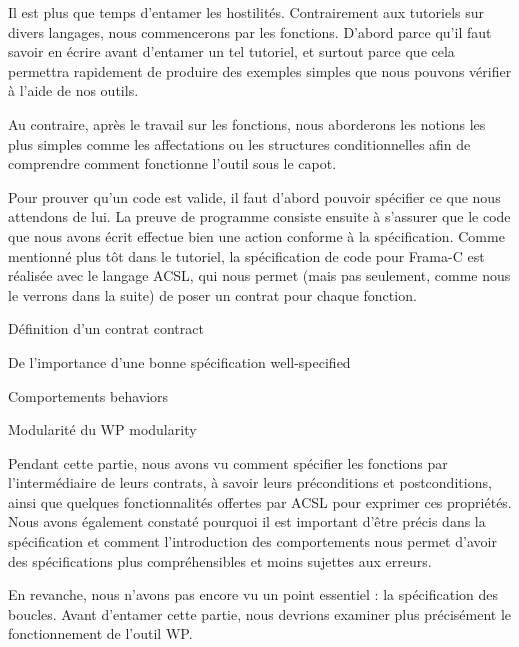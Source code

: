 
Il est plus que temps d'entamer les hostilités. Contrairement aux tutoriels
sur divers langages, nous commencerons par les fonctions. D'abord parce
qu'il faut savoir en écrire avant d'entamer un tel tutoriel, et surtout
parce que cela permettra rapidement de produire des exemples simples que
nous pouvons vérifier à l'aide de nos outils.



Au contraire, après le travail sur les fonctions, nous aborderons les notions
les plus simples comme les affectations ou les structures conditionnelles afin
de comprendre comment fonctionne l'outil sous le capot.



Pour prouver qu'un code est valide, il faut d'abord pouvoir spécifier
ce que nous attendons de lui. La preuve de programme consiste ensuite à
s'assurer que le code que nous avons écrit effectue bien une action conforme à
la spécification. Comme mentionné plus tôt dans le tutoriel, la
spécification de code pour Frama-C est réalisée avec le langage ACSL, qui
nous permet (mais pas seulement, comme nous le verrons dans la suite) de poser
un contrat pour chaque fonction.



\begin{levelTwo}
  {Définition d'un contrat}
  {contract}
\end{levelTwo}

\begin{levelTwo}
  {De l'importance d'une bonne spécification}
  {well-specified}
\end{levelTwo}

\begin{levelTwo}
  {Comportements}
  {behaviors}
\end{levelTwo}

\begin{levelTwo}
  {Modularité du WP}
  {modularity}
\end{levelTwo}

\horizontalLine
\newpage


Pendant cette partie, nous avons vu comment spécifier les fonctions par
l'intermédiaire de leurs contrats, à savoir leurs préconditions et postconditions,
ainsi que quelques fonctionnalités offertes par ACSL pour exprimer ces propriétés.
Nous avons également constaté pourquoi il est important d'être précis dans la
spécification et comment l'introduction des comportements nous permet d'avoir
des spécifications plus compréhensibles et moins sujettes aux erreurs.



En revanche, nous n'avons pas encore vu un point essentiel : la spécification
des boucles. Avant d'entamer cette partie, nous devrions examiner plus
précisément le fonctionnement de l'outil WP.
